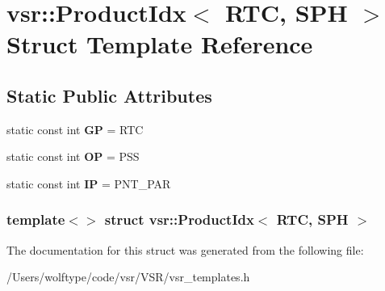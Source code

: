 \hypertarget{structvsr_1_1_product_idx_3_01_r_t_c_00_01_s_p_h_01_4}{\section{vsr\-:\-:Product\-Idx$<$ R\-T\-C, S\-P\-H $>$ Struct Template Reference}
\label{structvsr_1_1_product_idx_3_01_r_t_c_00_01_s_p_h_01_4}
}
\subsection*{Static Public Attributes}
\begin{DoxyCompactItemize}
\item 
\hypertarget{structvsr_1_1_product_idx_3_01_r_t_c_00_01_s_p_h_01_4_a8a5f870e11fb07043e709f5945a90597}{static const int {\bfseries G\-P} = R\-T\-C}\label{structvsr_1_1_product_idx_3_01_r_t_c_00_01_s_p_h_01_4_a8a5f870e11fb07043e709f5945a90597}

\item 
\hypertarget{structvsr_1_1_product_idx_3_01_r_t_c_00_01_s_p_h_01_4_a02e7f1f6707e2cc52386c47d401c40d0}{static const int {\bfseries O\-P} = P\-S\-S}\label{structvsr_1_1_product_idx_3_01_r_t_c_00_01_s_p_h_01_4_a02e7f1f6707e2cc52386c47d401c40d0}

\item 
\hypertarget{structvsr_1_1_product_idx_3_01_r_t_c_00_01_s_p_h_01_4_ae33d668c4bd2502bce48cd817e88565a}{static const int {\bfseries I\-P} = P\-N\-T\-\_\-\-P\-A\-R}\label{structvsr_1_1_product_idx_3_01_r_t_c_00_01_s_p_h_01_4_ae33d668c4bd2502bce48cd817e88565a}

\end{DoxyCompactItemize}
\subsubsection*{template$<$$>$ struct vsr\-::\-Product\-Idx$<$ R\-T\-C, S\-P\-H $>$}



The documentation for this struct was generated from the following file\-:\begin{DoxyCompactItemize}
\item 
/\-Users/wolftype/code/vsr/\-V\-S\-R/vsr\-\_\-templates.\-h\end{DoxyCompactItemize}
